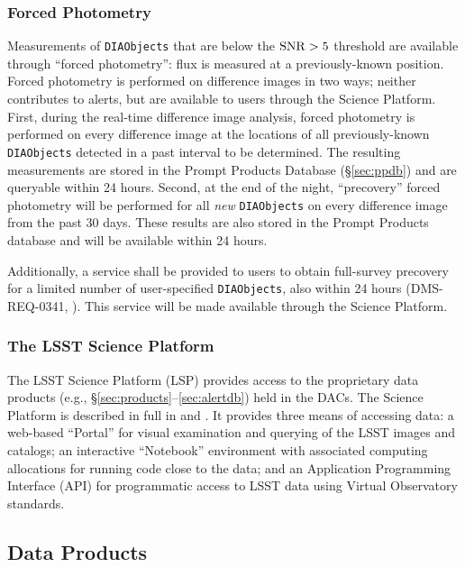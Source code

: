 \subsubsection{Forced Photometry}\label{sec:AGP_force}

Measurements of \texttt{DIAObjects} that are below the ${\rm SNR} > 5$ threshold are available through ``forced photometry'': flux is measured at a previously-known position.
Forced photometry is performed on difference images in two ways; neither contributes to alerts, but are available to users through the Science Platform.
First, during the real-time difference image analysis, forced photometry is performed on every difference image at the locations of all previously-known {\tt DIAObjects} detected in a past interval to be determined.
The resulting measurements are stored in the Prompt Products Database (\S \ref{sec:ppdb}) and are queryable within 24 hours.
Second, at the end of the night, ``precovery'' forced photometry will be performed for all \textit{new} \texttt{DIAObjects} on every difference image from the past 30 days.
These results are also stored in the Prompt Products database and will be available within 24 hours.

Additionally, a service shall be provided to users to obtain full-survey precovery for a limited number of user-specified {\tt DIAObjects}, also within 24 hours (DMS-REQ-0341, ).
This service will be made available through the Science Platform.

\subsubsection{The LSST Science Platform} \label{sec:LSP}

The LSST Science Platform (LSP) provides access to the proprietary data products (e.g., \S \ref{sec:products}--\ref{sec:alertdb}) held in the DACs.
The Science Platform is described in full in  and .
It provides three means of accessing data: a web-based ``Portal'' for visual examination and querying of the LSST images and catalogs;
an interactive ``Notebook'' environment with associated computing allocations for running code close to the data;
and an Application Programming Interface (API) for programmatic access to LSST data using Virtual Observatory standards.

\subsection{Data Products}
